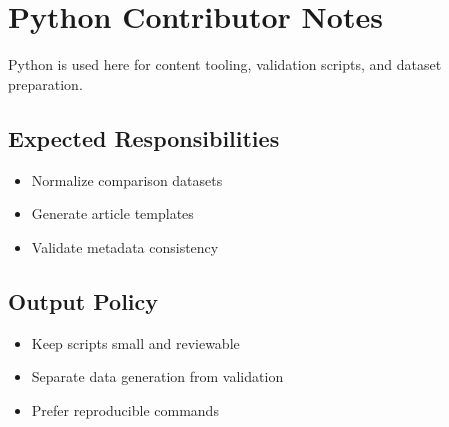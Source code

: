 \section{Python Contributor Notes}

Python is used here for content tooling, validation scripts, and dataset preparation.

\subsection{Expected Responsibilities}
\begin{itemize}
  \item Normalize comparison datasets
  \item Generate article templates
  \item Validate metadata consistency
\end{itemize}

\subsection{Output Policy}
\begin{itemize}
  \item Keep scripts small and reviewable
  \item Separate data generation from validation
  \item Prefer reproducible commands
\end{itemize}

